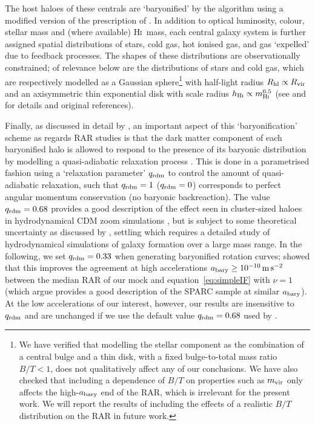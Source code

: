 \documentclass[usenatbib]{mnras}
\newcommand{\Hi}{\textsc{Hi}}
\newcommand{\abary}{\ensuremath{a_{\rm bary}}}
\newcommand{\msq}{\ensuremath{{\rm \,m\,s}^{-2}}}
\newcommand{\eqn}[1]{equation~\eqref{#1}}
\begin{document}
 
The host haloes of these centrals are `baryonified' by the  algorithm using a modified version of the prescription of \citet{st15}. In addition to optical luminosity, colour, stellar mass and (where available) \Hi\ mass,  each central galaxy system is further assigned spatial distributions of stars, cold gas, hot ionised gas, and gas `expelled' due to feedback processes. The shapes of these distributions  are observationally constrained; of relevance below are the distributions of stars and cold gas, which are respectively modelled as a Gaussian sphere\footnote{We have verified that modelling the stellar component as the combination of a central bulge and a thin disk, with a fixed bulge-to-total mass ratio $B/T<1$, does not qualitatively affect any of our conclusions. We have also checked that including a dependence of $B/T$ on properties such as $m_{\rm vir}$ only affects the high-$\abary$ end of the RAR, which is irrelevant for the present work. We will report the results of including the effects of a realistic $B/T$ distribution on the RAR in future work.} with half-light radius $R_{\rm hl}\propto R_{\rm vir}$ and an axisymmetric thin exponential disk with scale radius $h_{\Hi}\propto m_{\Hi}^{0.5}$ (see  and  for details and original references).

Finally, as discussed in detail by  , an important aspect of this `baryonification' scheme as regards RAR studies is that the dark matter component of each baryonified halo is allowed to respond to the presence of its baryonic distribution by modelling a quasi-adiabatic relaxation process \citep[][see section~3 of ]{teyssier+11,st15}. This is done in a parametrised fashion using a `relaxation parameter' $q_{\rm rdm}$ to  control the amount of quasi-adiabatic relaxation, such that $q_{\rm rdm}=1$ ($q_{\rm rdm}=0$) corresponds to perfect angular momentum conservation (no baryonic backreaction). The value $q_{\rm rdm}=0.68$ provides a good description of the effect seen in cluster-sized haloes in hydrodynamical CDM zoom simulations \citep{teyssier+11,st15}, but is subject to some theoretical uncertainty as discussed by , settling which requires a detailed study of hydrodynamical simulations of galaxy formation over a large mass range. 
In the following, we set $q_{\rm rdm}=0.33$ when generating baryonified rotation curves;  showed that this improves the agreement at high accelerations $\abary\geq10^{-10}\msq$ between the median RAR of our mock and \eqn{eq:simpleIF} with $\nu=1$ (which \citealp{efe20} argue provides a good description of the SPARC sample at similar \abary). At the low accelerations of our interest, however, our results are insensitive to $q_{\rm rdm}$ and are unchanged if we use the default value $q_{\rm rdm}=0.68$ used by .
\end{document}

